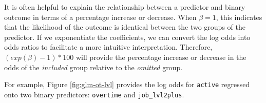 \documentclass[
]{book}
\newenvironment{Shaded}{\begin{snugshade}}{\end{snugshade}}
\newcommand{\AttributeTok}[1]{\textcolor[rgb]{0.77,0.63,0.00}{#1}}
\newcommand{\CommentTok}[1]{\textcolor[rgb]{0.56,0.35,0.01}{\textit{#1}}}
\newcommand{\DecValTok}[1]{\textcolor[rgb]{0.00,0.00,0.81}{#1}}
\newcommand{\FunctionTok}[1]{\textcolor[rgb]{0.00,0.00,0.00}{#1}}
\newcommand{\NormalTok}[1]{#1}
\newcommand{\OtherTok}[1]{\textcolor[rgb]{0.56,0.35,0.01}{#1}}
\newcommand{\SpecialCharTok}[1]{\textcolor[rgb]{0.00,0.00,0.00}{#1}}
\newcommand{\StringTok}[1]{\textcolor[rgb]{0.31,0.60,0.02}{#1}}
\begin{document}
It is often helpful to explain the relationship between a predictor and binary outcome in terms of a percentage increase or decrease. When \(\beta = 1\), this indicates that the likelihood of the outcome is identical between the two groups of the predictor. If we exponentiate the coefficients, we can convert the log odds into odds ratios to facilitate a more intuitive interpretation. Therefore, \((exp(\beta) - 1) * 100\) will provide the percentage increase or decrease in the odds of the \emph{included} group relative to the \emph{omitted} group.

For example, Figure \ref{fig:glm-ot-lvl} provides the log odds for \texttt{active} regressed onto two binary predictors: \texttt{overtime} and \texttt{job\_lvl2plus}.

\begin{Shaded}
\end{Shaded}

\providecommand{\docline}[3]{\noalign{\global\setlength{\arrayrulewidth}{#1}}\arrayrulecolor[HTML]{#2}\cline{#3}}

\setlength{\tabcolsep}{2pt}

\renewcommand*{\arraystretch}{1.5}
\end{document}
